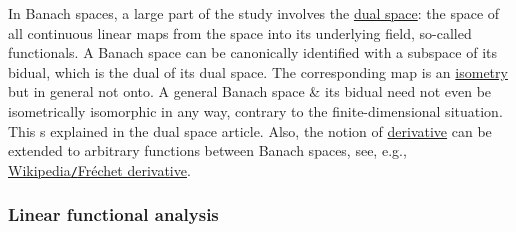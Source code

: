 \documentclass{article}
\begin{document}
\begin{itemize}
	In Banach spaces, a large part of the study involves the \href{https://en.wikipedia.org/wiki/Continuous_dual}{dual space}: the space of all continuous linear maps from the space into its underlying field, so-called functionals. A Banach space can be canonically identified with a subspace of its bidual, which is the dual of its dual space. The corresponding map is an \href{https://en.wikipedia.org/wiki/Isometry}{isometry} but in general not onto. A general Banach space \& its bidual need not even be isometrically isomorphic in any way, contrary to the finite-dimensional situation. This s explained in the dual space article. Also, the notion of \href{https://en.wikipedia.org/wiki/Derivative}{derivative} can be extended to arbitrary functions between Banach spaces, see, e.g., \href{https://en.wikipedia.org/wiki/Fr%C3%A9chet_derivative}{Wikipedia{\tt/}Fr\'echet derivative}.
\end{itemize}

\subsubsection{Linear functional analysis}
\end{document}
